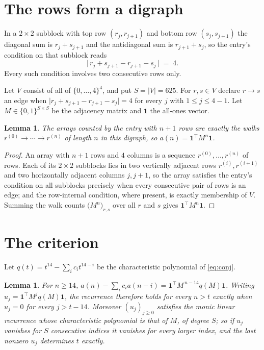 \documentclass[11pt,a4paper]{article}
\theoremstyle{plain}
\newtheorem{lemma}[theorem]{Lemma}
\theoremstyle{definition}
\begin{document}
\section{The rows form a digraph}

In a $2\times2$ subblock with top row $(r_j,r_{j+1})$ and bottom row $(s_j,s_{j+1})$ the
diagonal sum is $r_j+s_{j+1}$ and the antidiagonal sum is $r_{j+1}+s_j$, so the entry's
condition on that subblock reads
\[
\bigl|\,r_j+s_{j+1}-r_{j+1}-s_j\,\bigr|\;=\;4.
\]
Every such condition involves two consecutive rows only.

Let $V$ consist of all of $\{0,\dots,4\}^{4}$, and put $S=|V|=625$. For $r,s\in V$ declare $r\to s$ an edge
when $\bigl|r_j+s_{j+1}-r_{j+1}-s_j\bigr|=4$ for every $j$ with
$1\le j\le4-1$. Let $M\in\{0,1\}^{S\times S}$ be the adjacency matrix and $\mathbf{1}$
the all-ones vector.

\begin{lemma}\label{lem:walk}
The arrays counted by the entry with $n+1$ rows are exactly the walks
$r^{(0)}\to\cdots\to r^{(n)}$ of length $n$ in this digraph, so
$a(n)=\mathbf{1}^{\!\top}M^{n}\mathbf{1}$.
\end{lemma}

\begin{proof}
An array with $n+1$ rows and $4$ columns is a sequence $r^{(0)},\dots,r^{(n)}$ of
rows. Each of its $2\times2$ subblocks lies in two vertically adjacent rows
$r^{(i)},r^{(i+1)}$ and two horizontally adjacent columns $j,j+1$, so the array satisfies
the entry's condition on all subblocks precisely when every consecutive pair of rows is an
edge; and the row-internal condition, where present, is exactly membership of $V$. Summing
the walk counts $\bigl(M^{n}\bigr)_{r,s}$ over all $r$ and $s$ gives
$\mathbf{1}^{\!\top}M^{n}\mathbf{1}$.
\end{proof}

\section{The criterion}

Let $q(t)=t^{14}-\sum_i c_i t^{14-i}$ be the characteristic polynomial of
\eqref{eq:conj}.

\begin{lemma}\label{lem:crit}
For $n\ge14$,
$a(n)-\sum_i c_i a(n-i)=\mathbf{1}^{\!\top}M^{\,n-14}q(M)\mathbf{1}$. Writing
$u_j=\mathbf{1}^{\!\top}M^{j}q(M)\mathbf{1}$, the recurrence therefore holds for every
$n>t$ exactly when $u_j=0$ for every $j>t-14$. Moreover $(u_j)_{j\ge0}$ satisfies the
monic linear recurrence whose characteristic polynomial is that of $M$, of degree $S$; so
if $u_j$ vanishes for $S$ consecutive indices it vanishes for every larger index, and the
last nonzero $u_j$ determines $t$ exactly.
\end{lemma}
\end{document}
